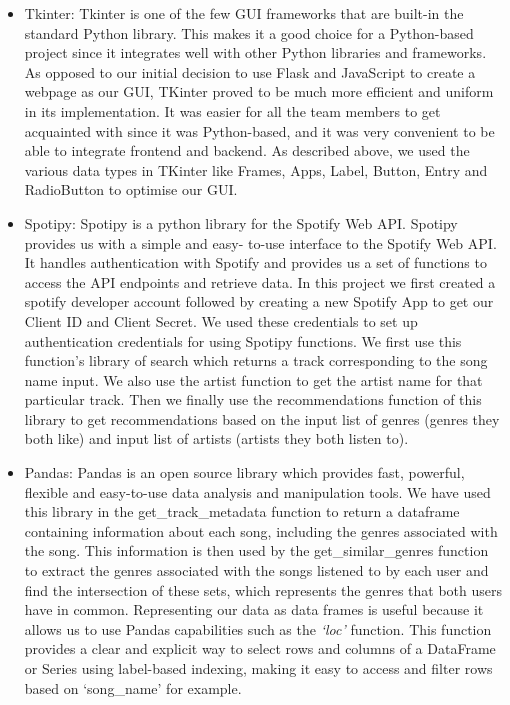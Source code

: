 \documentclass[fontsize=11pt]{article}
\begin{document}
\begin{itemize}
\item Tkinter: Tkinter is one of the few GUI frameworks that are built-in the standard Python library. This makes it a good choice for a Python-based project since it integrates well with other Python libraries and frameworks. As opposed to our initial decision to use Flask and JavaScript to create a webpage as our GUI, TKinter proved to be much more efficient and uniform in its implementation. It was easier for all the team members to get acquainted with since it was Python-based, and it was very convenient to be able to integrate frontend and backend. As described above, we used the various data types in TKinter like Frames, Apps, Label, Button, Entry and RadioButton to optimise our GUI.

\item Spotipy: Spotipy is a python library for the Spotify Web API. Spotipy provides us with a simple and easy- to-use interface to the Spotify Web API. It handles authentication with Spotify and provides us a set of functions to access the API endpoints and retrieve data. In this project we first created a spotify developer account followed by creating a new Spotify App to get our Client ID and Client Secret. We used these credentials to set up authentication credentials for using Spotipy functions. We first use this function’s library of search which returns a track corresponding to the song name input. We also use the artist function to get the artist name for that particular track. Then we finally use the recommendations function of this library to get recommendations based on the input list of genres (genres they both like) and input list of artists (artists they both listen to).
\item Pandas: Pandas is an open source library which provides fast, powerful, flexible and easy-to-use data analysis and manipulation tools. We have used this library in the get\_track\_metadata function to return a dataframe containing information about each song, including the genres associated with the song. This information is then used by the get\_similar\_genres function to extract the genres associated with the songs listened to by each user and find the intersection of these sets, which represents the genres that both users have in common. Representing our data as data frames is useful because it allows us to use Pandas capabilities such as the \textit{‘loc’} function. This function provides a clear and explicit way to select rows and columns of a DataFrame or Series using label-based indexing, making it easy to access and filter rows based on ‘song\_name’ for example. 

\end{itemize}
\end{document}
